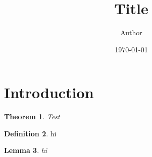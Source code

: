 \documentclass{article}
\title{Title}
\author{Author}
\date{\today}
\newtheorem{theorem}{Theorem}[section]
\newtheorem{lemma}[theorem]{Lemma}
\theoremstyle{definition}
\newtheorem{definition}[theorem]{Definition}
\theoremstyle{remark}
\begin{document}
\maketitle

\section{Introduction}
\begin{theorem}
    Test
\end{theorem}
\begin{definition}
    hi
\end{definition}
\begin{lemma}
    hi
\end{lemma}
\end{document}
